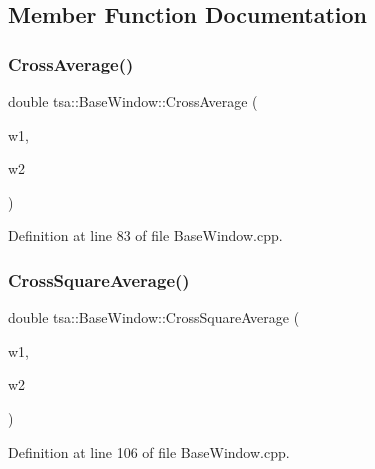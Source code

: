 \subsection{Member Function Documentation}
\mbox{\label{classtsa_1_1_base_window_a4bd3edc44a56103ac3f9112a55a10420}} 
\subsubsection{\texorpdfstring{Cross\+Average()}{CrossAverage()}}
{\footnotesize\ttfamily double tsa\+::\+Base\+Window\+::\+Cross\+Average (\begin{DoxyParamCaption}\item[{\hyperlink{classtsa_1_1_base_window}{Base\+Window} \&}]{w1,  }\item[{\hyperlink{classtsa_1_1_base_window}{Base\+Window} \&}]{w2 }\end{DoxyParamCaption})\hspace{0.3cm}{\ttfamily [static]}}



Definition at line 83 of file Base\+Window.\+cpp.

\mbox{\label{classtsa_1_1_base_window_a31f86887f9ccbddd97bdca903c506606}} 
\subsubsection{\texorpdfstring{Cross\+Square\+Average()}{CrossSquareAverage()}}
{\footnotesize\ttfamily double tsa\+::\+Base\+Window\+::\+Cross\+Square\+Average (\begin{DoxyParamCaption}\item[{\hyperlink{classtsa_1_1_base_window}{Base\+Window} \&}]{w1,  }\item[{\hyperlink{classtsa_1_1_base_window}{Base\+Window} \&}]{w2 }\end{DoxyParamCaption})\hspace{0.3cm}{\ttfamily [static]}}



Definition at line 106 of file Base\+Window.\+cpp.

